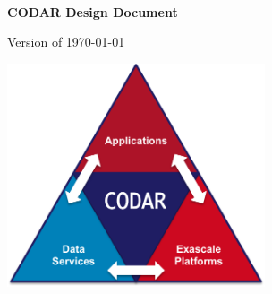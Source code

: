 
{\em \ }

\vspace{0.1in}

\begin{center}

{\Large \textbf{CODAR Design Document}}

\vspace{0.3in}

{\huge \textbf{\TITLE{}}}

\vspace{0.2in}

\large{Version of \today}

\end{center}

\vspace{0.2in}

\begin{center}

\AUTHORS{}

\end{center}

\vspace{2in}

\begin{center}
\includegraphics[width=3in]{Figs/CODAR.png}
\end{center}

\vspace{1in}


